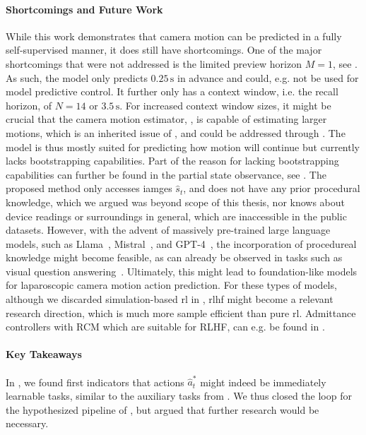 \paragraph{Shortcomings and Future Work}
While this work demonstrates that camera motion can be predicted in a fully self-supervised manner, it does still have shortcomings. One of the major shortcomings that were not addressed is the limited preview horizon $M=1$, see . As such, the model only predicts $0.25\,\text{s}$ in advance and could, e.g. not be used for model predictive control. It further only has a context window, i.e. the recall horizon, of $N=14$ or $3.5\,\text{s}$. For increased context window sizes, it might be crucial that the camera motion estimator, , is capable of estimating larger motions, which is an inherited issue of , and could be addressed through . The model is thus mostly suited for predicting how motion will continue but currently lacks bootstrapping capabilities. Part of the reason for lacking bootstrapping capabilities can further be found in the partial state observance, see . The proposed method only accesses iamges $\hat{s}_t$, and does not have any prior procedural knowledge, which we argued was beyond scope of this thesis, nor knows about device readings or surroundings in general, which are inaccessible in the public datasets. However, with the advent of massively pre-trained large language models, such as Llama~\cite{touvron2023llama}, Mistral~\cite{jiang2023mistral}, and GPT-4~\cite{achiam2023gpt}, the incorporation of procedureal knowledge might become feasible, as can already be observed in tasks such as visual question answering~\cite{seenivasan2022surgical}. Ultimately, this might lead to foundation-like models for laparoscopic camera motion action prediction. For these types of models, although we discarded simulation-based \acrshort{rl} in , \acrfull{rlhf} might become a relevant research direction, which is much more sample efficient than pure \acrshort{rl}. Admittance controllers with RCM which are suitable for \acrshort{RLHF}, can e.g. be found in .

\paragraph{Key Takeaways}
In , we found first indicators that actions $\hat{a}^*_t$ might indeed be immediately learnable tasks, similar to the auxiliary tasks from . We thus closed the loop for the hypothesized pipeline of , but argued that further research would be necessary.


